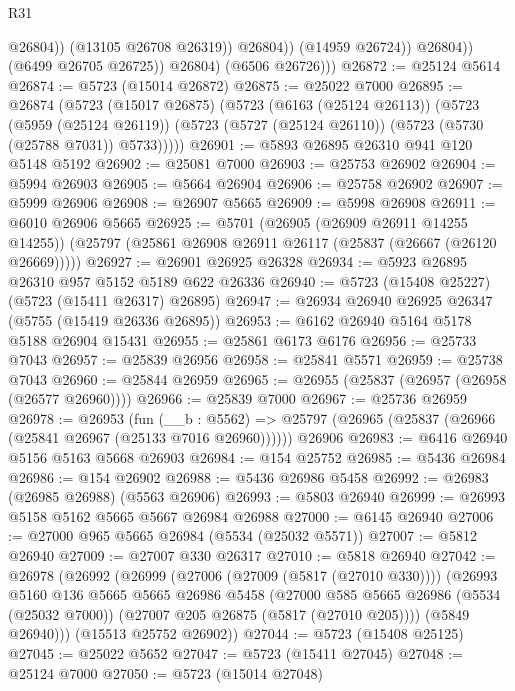 \begin{lexlean}{R31}
\begin{coremodule}
                            @26804))
                        (@13105 @26708 @26319))
                      @26804))
                  (@14959 @26724))
                @26804))
            (@6499 @26705 @26725))
          @26804)
        (@6506 @26726)))
@26872 := @25124 @5614
@26874 := @5723 (@15014 @26872)
@26875 := @25022 @7000
@26895 := @26874
    (@5723
      (@15017 @26875)
      (@5723
        (@6163 (@25124 @26113))
        (@5723
          (@5959 (@25124 @26119))
          (@5723 (@5727 (@25124 @26110)) (@5723 (@5730 (@25788 @7031)) @5733)))))
@26901 := @5893 @26895 @26310 @941 @120 @5148 @5192
@26902 := @25081 @7000
@26903 := @25753 @26902
@26904 := @5994 @26903
@26905 := @5664 @26904
@26906 := @25758 @26902
@26907 := @5999 @26906
@26908 := @26907 @5665
@26909 := @5998 @26908
@26911 := @6010 @26906 @5665
@26925 := @5701
    (@26905 (@26909 @26911 @14255 @14255))
    (@25797 (@25861 @26908 @26911 @26117 (@25837 (@26667 (@26120 @26669)))))
@26927 := @26901 @26925 @26328
@26934 := @5923 @26895 @26310 @957 @5152 @5189 @622 @26336
@26940 := @5723 (@15408 @25227) (@5723 (@15411 @26317) @26895)
@26947 := @26934 @26940 @26925 @26347 (@5755 (@15419 @26336 @26895))
@26953 := @6162 @26940 @5164 @5178 @5188 @26904 @15431
@26955 := @25861 @6173 @6176
@26956 := @25733 @7043
@26957 := @25839 @26956
@26958 := @25841 @5571
@26959 := @25738 @7043
@26960 := @25844 @26959
@26965 := @26955 (@25837 (@26957 (@26958 (@26577 @26960))))
@26966 := @25839 @7000
@26967 := @25736 @26959
@26978 := @26953
    (fun (__b : @5562) => @25797 (@26965 (@25837 (@26966 (@25841 @26967 (@25133 @7016 @26960))))))
    @26906
@26983 := @6416 @26940 @5156 @5163 @5668 @26903
@26984 := @154 @25752
@26985 := @5436 @26984
@26986 := @154 @26902
@26988 := @5436 @26986 @5458
@26992 := @26983 (@26985 @26988) (@5563 @26906)
@26993 := @5803 @26940
@26999 := @26993 @5158 @5162 @5665 @5667 @26984 @26988
@27000 := @6145 @26940
@27006 := @27000 @965 @5665 @26984 (@5534 (@25032 @5571))
@27007 := @5812 @26940
@27009 := @27007 @330 @26317
@27010 := @5818 @26940
@27042 := @26978
    (@26992
      (@26999
        (@27006 (@27009 (@5817 (@27010 @330))))
        (@26993
          @5160
          @136
          @5665
          @5665
          @26986
          @5458
          (@27000
            @585
            @5665
            @26986
            (@5534 (@25032 @7000))
            (@27007 @205 @26875 (@5817 (@27010 @205))))
          (@5849 @26940)))
      (@15513 @25752 @26902))
@27044 := @5723 (@15408 @25125)
@27045 := @25022 @5652
@27047 := @5723 (@15411 @27045)
@27048 := @25124 @7000
@27050 := @5723 (@15014 @27048)

\end{coremodule}
\end{lexlean}
